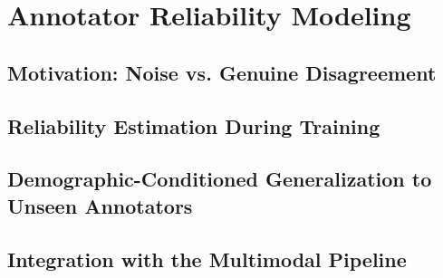 \chapter{Annotator Reliability Modeling}\label{cap:annotator-reliability}

\section{Motivation: Noise vs. Genuine Disagreement}\label{sec:motivation-noise-vs-disagreement}

\section{Reliability Estimation During Training}\label{sec:reliability-estimation-training}

\section{Demographic-Conditioned Generalization to Unseen Annotators}\label{sec:demographic-conditioned-generalization}

\section{Integration with the Multimodal Pipeline}\label{sec:integration-multimodal-pipeline}
